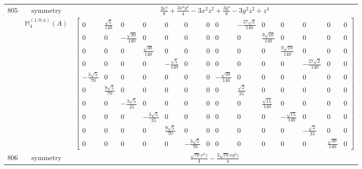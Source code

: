 \documentclass[fleqn,8pt,landscape]{jsarticle}
\begin{document}
\begin{longtable}{ccc}
$ 805 $ & $ \text{symmetry} $ & $ \frac{3 x^{4}}{8} + \frac{3 x^{2} y^{2}}{4} - 3 x^{2} z^{2} + \frac{3 y^{4}}{8} - 3 y^{2} z^{2} + z^{4} $ \\
$  $ & $ \mathbb{M}_{4}^{(1,0;a)}(A) $ & $ \begin{bmatrix} 0 & \frac{\sqrt{5}}{140} & 0 & 0 & 0 & 0 & 0 & 0 & - \frac{27 \sqrt{2}}{140} & 0 & 0 & 0 & 0 & 0 \\ 0 & 0 & - \frac{\sqrt{30}}{140} & 0 & 0 & 0 & 0 & 0 & 0 & \frac{9 \sqrt{10}}{140} & 0 & 0 & 0 & 0 \\ 0 & 0 & 0 & \frac{\sqrt{30}}{140} & 0 & 0 & 0 & 0 & 0 & 0 & \frac{9 \sqrt{10}}{140} & 0 & 0 & 0 \\ 0 & 0 & 0 & 0 & - \frac{\sqrt{5}}{140} & 0 & 0 & 0 & 0 & 0 & 0 & - \frac{27 \sqrt{2}}{140} & 0 & 0 \\ - \frac{3 \sqrt{5}}{70} & 0 & 0 & 0 & 0 & 0 & 0 & - \frac{\sqrt{30}}{140} & 0 & 0 & 0 & 0 & 0 & 0 \\ 0 & \frac{9 \sqrt{5}}{70} & 0 & 0 & 0 & 0 & 0 & 0 & \frac{\sqrt{2}}{35} & 0 & 0 & 0 & 0 & 0 \\ 0 & 0 & - \frac{3 \sqrt{5}}{35} & 0 & 0 & 0 & 0 & 0 & 0 & \frac{\sqrt{15}}{140} & 0 & 0 & 0 & 0 \\ 0 & 0 & 0 & - \frac{3 \sqrt{5}}{35} & 0 & 0 & 0 & 0 & 0 & 0 & - \frac{\sqrt{15}}{140} & 0 & 0 & 0 \\ 0 & 0 & 0 & 0 & \frac{9 \sqrt{5}}{70} & 0 & 0 & 0 & 0 & 0 & 0 & - \frac{\sqrt{2}}{35} & 0 & 0 \\ 0 & 0 & 0 & 0 & 0 & - \frac{3 \sqrt{5}}{70} & 0 & 0 & 0 & 0 & 0 & 0 & \frac{\sqrt{30}}{140} & 0 \end{bmatrix} $ \\ \hline
$ 806 $ & $ \text{symmetry} $ & $ \frac{\sqrt{70} x^{3} z}{4} - \frac{3 \sqrt{70} x y^{2} z}{4} $ \\

\end{longtable}
\end{document}
